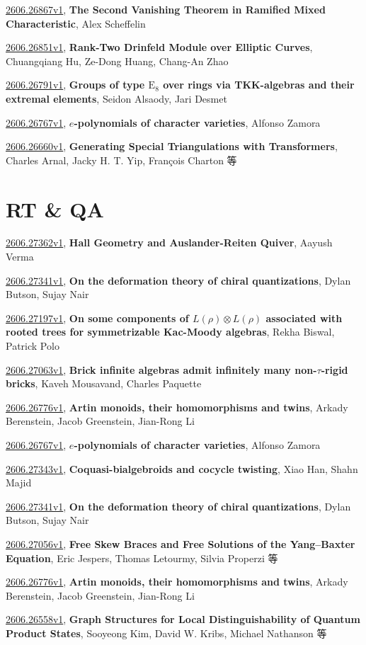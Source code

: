 \documentclass[9pt, a4paper]{article}
\theoremstyle{plain}
\theoremstyle{definition}
\theoremstyle{remark}
\newcommand{\arxiv}[3]{\href{https://arxiv.org/abs/#1}{#1}, \textbf{\textcolor{arxivblue}{#2}}, #3}
\begin{document}
\arxiv{2606.26867v1}{The Second Vanishing Theorem in Ramified Mixed Characteristic}{Alex Scheffelin}

\arxiv{2606.26851v1}{Rank-Two Drinfeld Module over Elliptic Curves}{Chuangqiang Hu, Ze-Dong Huang, Chang-An Zhao}

\arxiv{2606.26791v1}{Groups of type $\mathrm{E}_8$ over rings via TKK-algebras and their extremal elements}{Seidon Alsaody, Jari Desmet}

\arxiv{2606.26767v1}{$e$-polynomials of character varieties}{Alfonso Zamora}

\arxiv{2606.26660v1}{Generating Special Triangulations with Transformers}{Charles Arnal, Jacky H. T. Yip, François Charton 等}


\section{RT \& QA}
\arxiv{2606.27362v1}{Hall Geometry and Auslander-Reiten Quiver}{Aayush Verma}

\arxiv{2606.27341v1}{On the deformation theory of chiral quantizations}{Dylan Butson, Sujay Nair}

\arxiv{2606.27197v1}{On some components of $L(ρ)\otimes L(ρ)$ associated with rooted trees for symmetrizable Kac-Moody algebras}{Rekha Biswal, Patrick Polo}

\arxiv{2606.27063v1}{Brick infinite algebras admit infinitely many non-$τ$-rigid bricks}{Kaveh Mousavand, Charles Paquette}

\arxiv{2606.26776v1}{Artin monoids, their homomorphisms and twins}{Arkady Berenstein, Jacob Greenstein, Jian-Rong Li}

\arxiv{2606.26767v1}{$e$-polynomials of character varieties}{Alfonso Zamora}

\arxiv{2606.27343v1}{Coquasi-bialgebroids and cocycle twisting}{Xiao Han, Shahn Majid}

\arxiv{2606.27341v1}{On the deformation theory of chiral quantizations}{Dylan Butson, Sujay Nair}

\arxiv{2606.27056v1}{Free Skew Braces and Free Solutions of the Yang--Baxter Equation}{Eric Jespers, Thomas Letourmy, Silvia Properzi 等}

\arxiv{2606.26776v1}{Artin monoids, their homomorphisms and twins}{Arkady Berenstein, Jacob Greenstein, Jian-Rong Li}

\arxiv{2606.26558v1}{Graph Structures for Local Distinguishability of Quantum Product States}{Sooyeong Kim, David W. Kribs, Michael Nathanson 等}

\end{document}
